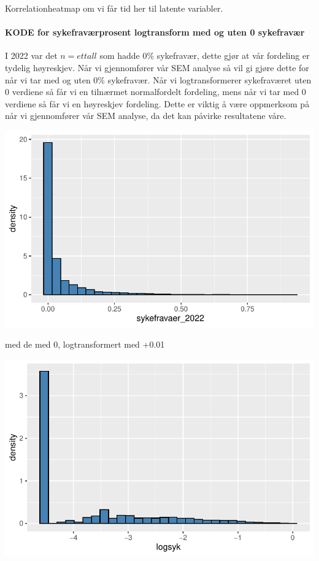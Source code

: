 \documentclass[
  12pt,
  a4paper,
  DIV=11,
  numbers=noendperiod]{scrartcl}
\let\oldparagraph\paragraph
\renewcommand{\paragraph}[1]{\oldparagraph{#1}\mbox{}}
\begin{document}
Korrelationheatmap om vi får tid her til latente variabler.

\paragraph{KODE for sykefraværprosent logtransform med og uten 0
sykefravær}\label{kode-for-sykefravuxe6rprosent-logtransform-med-og-uten-0-sykefravuxe6r}

I 2022 var det \(n=et tall\) som hadde 0\% sykefravær, dette gjør at vår
fordeling er tydelig høyreskjev. Når vi gjennomfører vår SEM analyse så
vil gi gjøre dette for når vi tar med og uten 0\% sykefravær. Når vi
logtransformerer sykefraværet uten 0 verdiene så får vi en tilnærmet
normalfordelt fordeling, mens når vi tar med 0 verdiene så får vi en
høyreskjev fordeling. Dette er viktig å være oppmerksom på når vi
gjennomfører vår SEM analyse, da det kan påvirke resultatene våre.

\includegraphics{kand_SOK2209_Bacheloroppgave_V25_files/figure-pdf/unnamed-chunk-16-1.pdf}

med de med 0, logtransformert med +0.01

\includegraphics{kand_SOK2209_Bacheloroppgave_V25_files/figure-pdf/unnamed-chunk-17-1.pdf}
\end{document}
